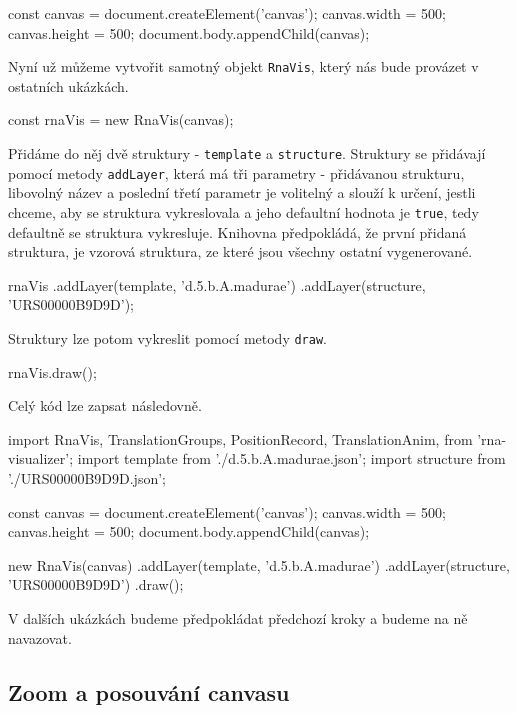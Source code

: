 \begin{code}
const canvas = document.createElement('canvas');
canvas.width = 500;
canvas.height = 500;
document.body.appendChild(canvas);
\end{code}

Nyní už můžeme vytvořit samotný objekt \texttt{RnaVis}, který nás bude provázet
v ostatních ukázkách.

\begin{code}
const rnaVis = new RnaVis(canvas);
\end{code}

Přidáme do něj dvě struktury - \texttt{template} a \texttt{structure}.
Struktury se přidávají pomocí metody \texttt{addLayer}, která má tři parametry
- přidávanou strukturu, libovolný název a poslední třetí parametr je volitelný
a slouží k určení, jestli chceme, aby se struktura vykreslovala a jeho
defaultní hodnota je \texttt{true}, tedy defaultně se struktura vykresluje.
Knihovna předpokládá, že první přidaná struktura, je vzorová struktura, ze
které jsou všechny ostatní vygenerované.

\begin{code}
rnaVis
  .addLayer(template, 'd.5.b.A.madurae')
  .addLayer(structure, 'URS00000B9D9D');
\end{code}

Struktury lze potom vykreslit pomocí metody \texttt{draw}.

\begin{code}
rnaVis.draw();
\end{code}

Celý kód lze zapsat následovně.

\begin{code}
import { 
  RnaVis, 
  TranslationGroups, 
  PositionRecord,
  TranslationAnim,
} from 'rna-visualizer';
import template from './d.5.b.A.madurae.json';
import structure from './URS00000B9D9D.json';

const canvas = document.createElement('canvas');
canvas.width = 500;
canvas.height = 500;
document.body.appendChild(canvas);

new RnaVis(canvas)
  .addLayer(template, 'd.5.b.A.madurae')
  .addLayer(structure, 'URS00000B9D9D')
  .draw();
\end{code}

V dalších ukázkách budeme předpokládat předchozí kroky a budeme na ně
navazovat.

\subsection{Zoom a posouvání canvasu}

